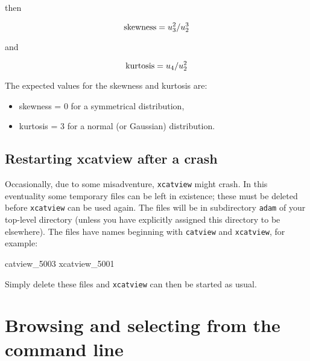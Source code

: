 \documentclass[twoside,11pt]{starlink}
\begin{document}
\begin{itemize}
   then

  \begin{equation}
   {\rm skewness} = u_{3}^{2} / u_{2}^{3}
  \end{equation}

   and

  \begin{equation}
   {\rm kurtosis} = u_{4} / u_{2}^{2}
  \end{equation}

   The expected values for the skewness and kurtosis are:

  \begin{itemize}

    \item skewness = 0 for a symmetrical distribution,

    \item kurtosis = 3 for a normal (or Gaussian) distribution.

  \end{itemize}

\end{itemize}

\subsection{Restarting xcatview after a crash}

Occasionally, due to some misadventure, \texttt{xcatview} might crash.  In
this eventuality some temporary files can be left in existence; these must
be deleted before \texttt{xcatview} can be used again.  The files will be in
subdirectory \texttt{adam} of your top-level directory (unless you have
explicitly assigned this directory to be elsewhere).  The files have names
beginning with \texttt{catview} and \texttt{xcatview}, for example:

\begin{terminalv}
catview_5003
xcatview_5001
\end{terminalv}

Simply delete these files and \texttt{xcatview} can then be started as usual.


\section{\label{VIEW}Browsing and selecting from the command line}
\end{document}
